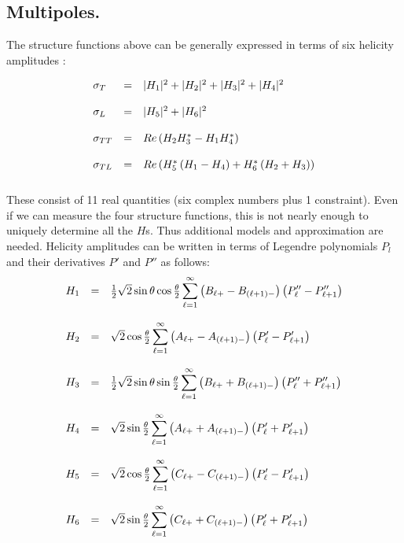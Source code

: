 \subsection{Multipoles.}
The structure functions above can be generally expressed in terms of six helicity amplitudes \cite{bib:walker}:

$$
\begin{array}{l c l}
\sigma_T & = & 
|H_1|^2+|H_2|^2 + |H_3|^2 + |H_4|^2
\\
\\
\sigma_L & = & 
|H_5|^2+|H_6|^2
\\
\\
\sigma_{TT} & = & 
Re\left(H_2H_3^*-H_1H_4^*\right)
\\
\\
\sigma_{TL} & = & 
Re\left(H_5^*\left(H_1-H_4\right)+H_6^*\left(H_2+H_3\right)\right)
\\
\\
\end{array}
$$
These consist of 11 real quantities (six complex numbers plus 1 constraint).
Even if we can measure the four structure functions, this is not nearly enough
to uniquely determine all the $H$s. Thus additional models and approximation are needed.
Helicity amplitudes can be written in terms of Legendre polynomials $P_l$ and their derivatives 
$P'$ and $P''$ as follows:
$$
\begin{array}{l c l}
H_1 & = & {1\over 2}\sqrt{2}\sin{\theta}\cos{\frac{\theta}{2}}\,
\displaystyle{\sum_{\ell=1}^\infty}\left( B_{\ell+}-B_{(\ell+1)-}\right)
\left( P''_\ell -P''_{\ell+1}\right) \\
\\
H_2 & = & \sqrt{2}\cos{\frac{\theta}{2}}\,
\displaystyle{\sum_{\ell=1}^\infty}\left( A_{\ell+}-A_{(\ell+1)-}\right)
\left( P'_\ell -P'_{\ell+1}\right) \\
\\
H_3 & = & {1\over 2}\sqrt{2}\sin{\theta}\sin{\frac{\theta}{2}}\,
\displaystyle{\sum_{\ell=1}^\infty}\left( B_{\ell+}+B_{(\ell+1)-}\right)
\left( P''_\ell +P''_{\ell+1}\right) \\
\\
H_4 & = & \sqrt{2}\sin{\frac{\theta}{2}}\,
\displaystyle{\sum_{\ell=1}^\infty}\left( A_{\ell+}+A_{(\ell+1)-}\right)
\left( P'_\ell +P'_{\ell+1}\right) \\
\\
H_5 & = & \sqrt{2}\cos{\frac{\theta}{2}}\,
\displaystyle{\sum_{\ell=1}^\infty}\left( C_{\ell+}-C_{(\ell+1)-}\right)
\left( P'_\ell -P'_{\ell+1}\right) \\
\\
H_6 & = & \sqrt{2}\sin{\frac{\theta}{2}}\,
\displaystyle{\sum_{\ell=1}^\infty}\left( C_{\ell+}+C_{(\ell+1)-}\right)
\left( P'_\ell +P'_{\ell+1}\right) \\
\end{array}
$$
